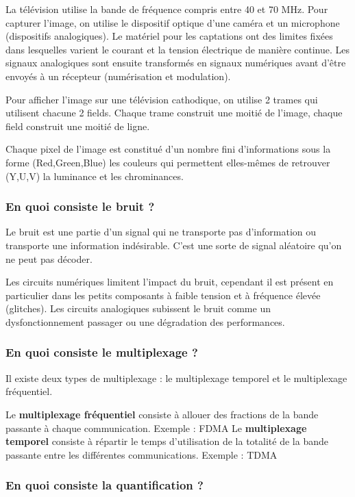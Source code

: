 La télévision utilise la bande de fréquence compris entre 40 et 70 MHz.  Pour capturer l'image, on utilise le dispositif optique d'une caméra et un microphone (dispositifs analogiques). Le matériel pour les captations ont des limites fixées dans lesquelles varient le courant et la tension électrique de manière continue. Les signaux analogiques sont ensuite transformés en signaux numériques avant d'être envoyés à un récepteur (numérisation et modulation).

Pour afficher l'image sur une télévision cathodique, on utilise 2 trames qui utilisent chacune 2 fields. Chaque trame construit une moitié de l'image, chaque field construit une moitié de ligne.

Chaque pixel de l'image est constitué d'un nombre fini d'informations sous la forme (Red,Green,Blue) les couleurs qui permettent elles-mêmes de retrouver (Y,U,V) la luminance et les chrominances.

\subsubsection{En quoi consiste le bruit ?}

Le bruit est une partie d'un signal qui ne transporte pas d'information ou transporte une information indésirable. C'est une sorte de signal aléatoire qu'on ne peut pas décoder.

Les circuits numériques limitent l'impact du bruit, cependant il est présent en particulier dans les petits composants à faible tension et à fréquence élevée (glitches). Les circuits analogiques subissent le bruit comme un dysfonctionnement passager ou une dégradation des performances.

\subsubsection{En quoi consiste le multiplexage ?}

Il existe deux types de multiplexage : le multiplexage temporel et le multiplexage fréquentiel.

Le \textbf{multiplexage fréquentiel} consiste à allouer des fractions de la bande passante à chaque communication. Exemple : FDMA \newline
Le \textbf{multiplexage temporel} consiste à répartir le temps d'utilisation de la totalité de la bande passante entre les différentes communications. Exemple : TDMA \newline

\subsubsection{En quoi consiste la quantification ?}

